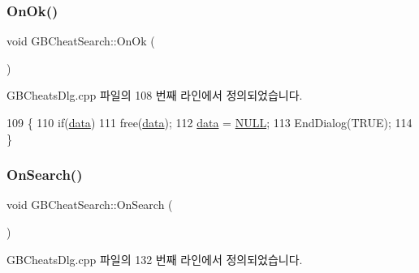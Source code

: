 \mbox{\label{class_g_b_cheat_search_a8a4503d0b05a2061a281f01b6e23f586}} 
\subsubsection{\texorpdfstring{On\+Ok()}{OnOk()}}
{\footnotesize\ttfamily void G\+B\+Cheat\+Search\+::\+On\+Ok (\begin{DoxyParamCaption}{ }\end{DoxyParamCaption})\hspace{0.3cm}{\ttfamily [protected]}}



G\+B\+Cheats\+Dlg.\+cpp 파일의 108 번째 라인에서 정의되었습니다.


\begin{DoxyCode}
109 \{
110   \textcolor{keywordflow}{if}(\mbox{\hyperlink{class_g_b_cheat_search_a3b53d05af5d79a51830df8d06256e1fc}{data}})
111     free(\mbox{\hyperlink{class_g_b_cheat_search_a3b53d05af5d79a51830df8d06256e1fc}{data}});
112   \mbox{\hyperlink{class_g_b_cheat_search_a3b53d05af5d79a51830df8d06256e1fc}{data}} = \mbox{\hyperlink{getopt1_8c_a070d2ce7b6bb7e5c05602aa8c308d0c4}{NULL}};
113   EndDialog(TRUE);
114 \}
\end{DoxyCode}
\mbox{\label{class_g_b_cheat_search_acdfee4ab94748a31036cd473c60a4573}} 
\subsubsection{\texorpdfstring{On\+Search()}{OnSearch()}}
{\footnotesize\ttfamily void G\+B\+Cheat\+Search\+::\+On\+Search (\begin{DoxyParamCaption}{ }\end{DoxyParamCaption})\hspace{0.3cm}{\ttfamily [protected]}}



G\+B\+Cheats\+Dlg.\+cpp 파일의 132 번째 라인에서 정의되었습니다.


